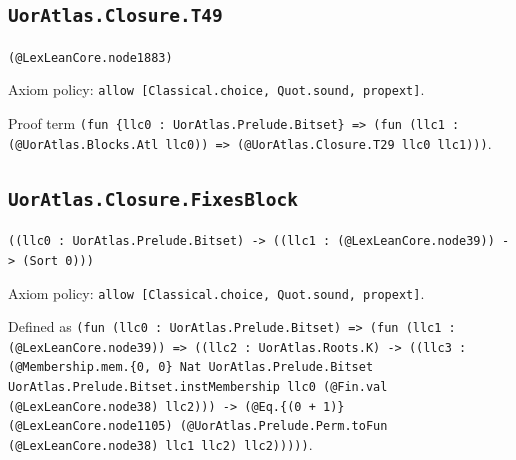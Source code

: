 \documentclass[11pt]{article}
\begin{document}
\subsection*{\texttt{UorAtlas.Closure.T49}}
\noindent\texttt{(@LexLeanCore.node1883)}\par
\noindent Axiom policy: \texttt{allow [Classical.choice, Quot.sound, propext]}.\par
\noindent Proof term \texttt{(fun \{llc0 : UorAtlas.Prelude.Bitset\} => (fun (llc1 : (@UorAtlas.Blocks.Atl llc0)) => (@UorAtlas.Closure.T29 llc0 llc1)))}.\par
\subsection*{\texttt{UorAtlas.Closure.FixesBlock}}
\noindent\texttt{((llc0 : UorAtlas.Prelude.Bitset) -> ((llc1 : (@LexLeanCore.node39)) -> (Sort 0)))}\par
\noindent Axiom policy: \texttt{allow [Classical.choice, Quot.sound, propext]}.\par
\noindent Defined as \texttt{(fun (llc0 : UorAtlas.Prelude.Bitset) => (fun (llc1 : (@LexLeanCore.node39)) => ((llc2 : UorAtlas.Roots.K) -> ((llc3 : (@Membership.mem.\{0, 0\} Nat UorAtlas.Prelude.Bitset UorAtlas.Prelude.Bitset.instMembership llc0 (@Fin.val (@LexLeanCore.node38) llc2))) -> (@Eq.\{(0 + 1)\} (@LexLeanCore.node1105) (@UorAtlas.Prelude.Perm.toFun (@LexLeanCore.node38) llc1 llc2) llc2)))))}.\par
\end{document}
